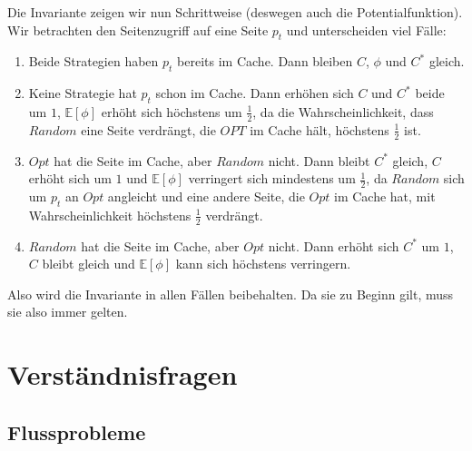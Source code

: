 \documentclass{panikzettel}
\begin{document}
Die Invariante zeigen wir nun Schrittweise (deswegen auch die Potentialfunktion). Wir betrachten den Seitenzugriff auf eine Seite $p_t$ und unterscheiden viel Fälle:
\begin{enumerate}
    \item Beide Strategien haben $p_t$ bereits im Cache. Dann bleiben $C$, $\phi$ und $C^\ast$ gleich.
    \item Keine Strategie hat $p_t$ schon im Cache. Dann erhöhen sich $C$ und $C^\ast$ beide um $1$, $\mathbb{E}[\phi]$ erhöht sich höchstens um $\frac{1}{2}$, da die Wahrscheinlichkeit, dass $Random$ eine Seite verdrängt, die $OPT$ im Cache hält, höchstens $\frac{1}{2}$ ist.
    \item $Opt$ hat die Seite im Cache, aber $Random$ nicht. Dann bleibt $C^\ast$ gleich, $C$ erhöht sich um $1$ und $\mathbb{E}[\phi]$ verringert sich mindestens um $\frac{1}{2}$, da $Random$ sich um $p_t$ an $Opt$ angleicht und eine andere Seite, die $Opt$ im Cache hat, mit Wahrscheinlichkeit höchstens $\frac{1}{2}$ verdrängt.
    \item $Random$ hat die Seite im Cache, aber $Opt$ nicht. Dann erhöht sich $C^\ast$ um $1$, $C$ bleibt gleich und $\mathbb{E}[\phi]$ kann sich höchstens verringern.
\end{enumerate}
Also wird die Invariante in allen Fällen beibehalten. Da sie zu Beginn gilt, muss sie also immer gelten.

\label{ende}
\newpage
\section{Verständnisfragen}

\subsection*{Flussprobleme}
\end{document}
